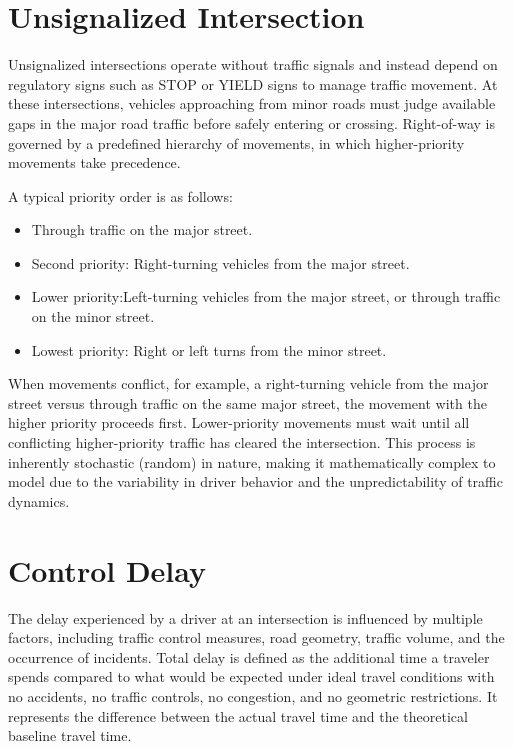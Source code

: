 \section{Unsignalized Intersection}
Unsignalized intersections operate without traffic signals 
and instead depend on regulatory signs such as STOP or YIELD 
signs to manage traffic movement. At these intersections, 
vehicles approaching from minor roads must judge available 
gaps in the major road traffic before safely entering or 
crossing. Right-of-way is governed by a predefined hierarchy 
of movements, in which higher-priority movements take 
precedence. 

A typical priority order is as follows:
\begin{itemize}
    \item  Through traffic on the major street.
    \item Second priority: Right-turning vehicles from the major street.
    \item  Lower priority:Left-turning vehicles from the major street, or through traffic on the minor street.
    \item Lowest priority: Right or left turns from the minor street.
\end{itemize}

When movements conflict, for example, a right-turning vehicle 
from the major street versus through traffic on the same 
major street, the movement with the higher priority proceeds 
first. Lower-priority movements must wait until all 
conflicting higher-priority traffic has cleared the 
intersection. This process is inherently stochastic (random) 
in nature, making it mathematically complex to model due to 
the variability in driver behavior and the unpredictability 
of traffic dynamics.

\section{Control Delay}

The delay experienced by a driver at an intersection is influenced 
by multiple factors, including traffic control measures, 
road geometry, traffic volume, and the occurrence of 
incidents. Total delay is defined as the additional time a 
traveler spends compared to what would be expected under 
ideal travel conditions with no accidents, no traffic 
controls, no congestion, and no geometric restrictions. It 
represents the difference between the actual travel time and 
the theoretical baseline travel time.

